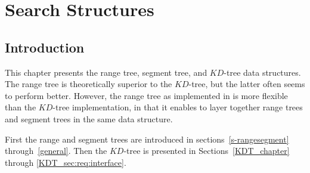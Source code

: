 \def\ccTagRmEigenClassName{\ccFalse}
\def\ccLongParamLayout{\ccTrue}

\ccThreeToTwo


\ccThreeToTwo


\chapter{Search Structures} \label{Trees}

\section{Introduction}

This chapter presents the {\cgal} range tree, segment tree, and $KD$-tree 
data structures. 
The range tree is theoretically superior to the $KD$-tree, but the 
latter often seems to perform better.
However, the range tree as implemented in {\cgal} is more flexible than the
$KD$-tree implementation, in that it enables to layer together range trees 
and segment trees in the same data structure.

First the range and segment trees are introduced in 
sections~\ref{s-rangesegment} through~\ref{general}.
Then the $KD$-tree is presented in Sections~\ref{KDT_chapter} through
\ref{KDT_sec:req:interface}.





%
%

